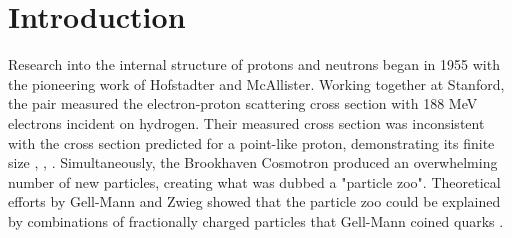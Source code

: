 

%


% 


\chapter{Introduction}
Research into the internal structure of protons and neutrons began in 1955 with the pioneering work of Hofstadter and McAllister.  Working together at Stanford, the pair measured the electron-proton scattering cross section with 188 MeV electrons incident on hydrogen. Their measured cross section was inconsistent with the cross section predicted for a point-like proton, demonstrating its finite size \cite{history-hofstadter:1955}, \cite{history-hofstadter:1956}, \cite{history-chambers:1956}.  Simultaneously, the Brookhaven Cosmotron produced an overwhelming number of new particles, creating what was dubbed a "particle zoo".  Theoretical efforts by Gell-Mann and Zwieg showed that the particle zoo could be explained by combinations of fractionally charged particles that Gell-Mann coined quarks \cite{history-zweig:1964}.  

